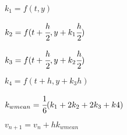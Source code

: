 \documentclass{article}
\begin{document}
\begin{center}\huge{
	\color{red}
	$k_1 = f( t, y )$

	\color{green}
	$k_2 = f( t + \cfrac{h}{2}, y + k_1\cfrac{h}{2})$

	\color{blue}
	$k_3 = f( t + \cfrac{h}{2}, y + k_2\cfrac{h}{2})$

	\color{white}
	$k_4 = f( t + h, y + k_3 h)$

	\color{magenta}
	$k_{wmean} = \cfrac{1}{6}( k_1 + 2k_2 + 2k_3 + k4)$

	$v_{n+1} = v_{n} + hk_{wmean}$

}
\end{center}
\end{document}
